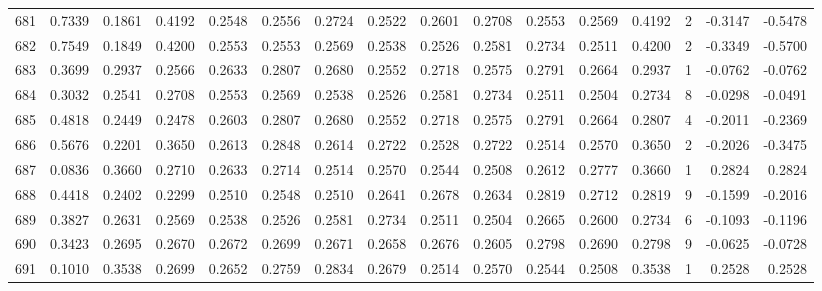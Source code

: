 \begin{tabular}{lrrrrrrrrrrrrrrr}
681 &      0.7339 &  0.1861 &  0.4192 &  0.2548 &  0.2556 &  0.2724 &  0.2522 &  0.2601 &  0.2708 &  0.2553 &   0.2569 &     0.4192 &      2 &                   -0.3147 &                    -0.5478 \\
682 &      0.7549 &  0.1849 &  0.4200 &  0.2553 &  0.2553 &  0.2569 &  0.2538 &  0.2526 &  0.2581 &  0.2734 &   0.2511 &     0.4200 &      2 &                   -0.3349 &                    -0.5700 \\
683 &      0.3699 &  0.2937 &  0.2566 &  0.2633 &  0.2807 &  0.2680 &  0.2552 &  0.2718 &  0.2575 &  0.2791 &   0.2664 &     0.2937 &      1 &                   -0.0762 &                    -0.0762 \\
684 &      0.3032 &  0.2541 &  0.2708 &  0.2553 &  0.2569 &  0.2538 &  0.2526 &  0.2581 &  0.2734 &  0.2511 &   0.2504 &     0.2734 &      8 &                   -0.0298 &                    -0.0491 \\
685 &      0.4818 &  0.2449 &  0.2478 &  0.2603 &  0.2807 &  0.2680 &  0.2552 &  0.2718 &  0.2575 &  0.2791 &   0.2664 &     0.2807 &      4 &                   -0.2011 &                    -0.2369 \\
686 &      0.5676 &  0.2201 &  0.3650 &  0.2613 &  0.2848 &  0.2614 &  0.2722 &  0.2528 &  0.2722 &  0.2514 &   0.2570 &     0.3650 &      2 &                   -0.2026 &                    -0.3475 \\
687 &      0.0836 &  0.3660 &  0.2710 &  0.2633 &  0.2714 &  0.2514 &  0.2570 &  0.2544 &  0.2508 &  0.2612 &   0.2777 &     0.3660 &      1 &                    0.2824 &                     0.2824 \\
688 &      0.4418 &  0.2402 &  0.2299 &  0.2510 &  0.2548 &  0.2510 &  0.2641 &  0.2678 &  0.2634 &  0.2819 &   0.2712 &     0.2819 &      9 &                   -0.1599 &                    -0.2016 \\
689 &      0.3827 &  0.2631 &  0.2569 &  0.2538 &  0.2526 &  0.2581 &  0.2734 &  0.2511 &  0.2504 &  0.2665 &   0.2600 &     0.2734 &      6 &                   -0.1093 &                    -0.1196 \\
690 &      0.3423 &  0.2695 &  0.2670 &  0.2672 &  0.2699 &  0.2671 &  0.2658 &  0.2676 &  0.2605 &  0.2798 &   0.2690 &     0.2798 &      9 &                   -0.0625 &                    -0.0728 \\
691 &      0.1010 &  0.3538 &  0.2699 &  0.2652 &  0.2759 &  0.2834 &  0.2679 &  0.2514 &  0.2570 &  0.2544 &   0.2508 &     0.3538 &      1 &                    0.2528 &                     0.2528 \\

\end{tabular}

